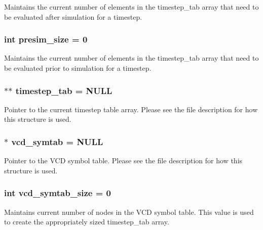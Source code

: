 Maintains the current number of elements in the timestep\_\-tab array that need to be evaluated after simulation for a timestep. 
\subsubsection{\setlength{\rightskip}{0pt plus 5cm}int {\bf presim\_\-size} = 0}\label{symtable_8c_a3}


Maintains the current number of elements in the timestep\_\-tab array that need to be evaluated prior to simulation for a timestep. 
\subsubsection{$\ast$$\ast$ {\bf timestep\_\-tab} = NULL}\label{symtable_8c_a2}


Pointer to the current timestep table array. Please see the file description for how this structure is used. 
\subsubsection{$\ast$ {\bf vcd\_\-symtab} = NULL}\label{symtable_8c_a0}


Pointer to the VCD symbol table. Please see the file description for how this structure is used. 
\subsubsection{\setlength{\rightskip}{0pt plus 5cm}int {\bf vcd\_\-symtab\_\-size} = 0}\label{symtable_8c_a1}


Maintains current number of nodes in the VCD symbol table. This value is used to create the appropriately sized timestep\_\-tab array. 